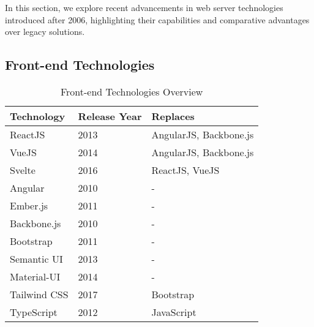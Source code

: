 \documentclass[conference]{IEEEtran}
\begin{document}
In this section, we explore recent advancements in web server technologies introduced after 2006, highlighting their capabilities and comparative advantages over legacy solutions.

\subsection{Front-end Technologies}

\begin{table}[ht]
    \centering
    \caption{Front-end Technologies Overview}
    \begin{tabular}{|l|l|l|}
    \hline
    \textbf{Technology} & \textbf{Release Year} & \textbf{Replaces} \\
    \hline
    ReactJS              & 2013                   & AngularJS, Backbone.js \\
    VueJS                & 2014                   & AngularJS, Backbone.js \\
    Svelte               & 2016                   & ReactJS, VueJS \\
    Angular              & 2010                   & - \\
    Ember.js             & 2011                   & - \\
    Backbone.js          & 2010                   & - \\
    Bootstrap            & 2011                   & - \\
    Semantic UI          & 2013                   & - \\
    Material-UI          & 2014                   & - \\
    Tailwind CSS         & 2017                   & Bootstrap \\
    TypeScript           & 2012                   & JavaScript \\
    \hline
    \end{tabular}
    \end{table}
\end{document}
